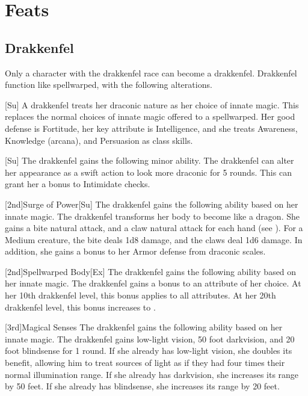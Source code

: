 \section{Feats}

    \subsection{Drakkenfel}

        Only a character with the drakkenfel race can become a drakkenfel. Drakkenfel function like spellwarped, with the following alterations.

        [Su]
        A drakkenfel treats her draconic nature as her choice of innate magic.
        This replaces the normal choices of innate magic offered to a spellwarped.
        Her good defense is Fortitude, her key attribute is Intelligence, and she treats Awareness, Knowledge (arcana), and Persuasion as class skills.

        [Su]
        The drakkenfel gains the following minor ability.
        The drakkenfel can alter her appearance as a swift action to look more draconic for 5 rounds.
        This can grant her a  bonus to Intimidate checks.

        [2nd]{Surge of Power}[Su]
        The drakkenfel gains the following ability based on her innate magic.
        The drakkenfel transforms her body to become like a dragon.
        She gains a bite natural attack, and a claw natural attack for each hand (see ).
        For a Medium creature, the bite deals 1d8 damage, and the claws deal 1d6 damage.
        In addition, she gains a  bonus to her Armor defense from draconic scales.

        [2nd]{Spellwarped Body}[Ex]
        The drakkenfel gains the following ability based on her innate magic.
        The drakkenfel gains a  bonus to an attribute of her choice.
        At her 10th drakkenfel level, this bonus applies to all attributes.
        At her 20th drakkenfel level, this bonus increases to .

        [3rd]{Magical Senses}
        The drakkenfel gains the following ability based on her innate magic.
        The drakkenfel gains low-light vision, 50 foot darkvision, and 20 foot blindsense for 1 round.
        If she already has low-light vision, she doubles its benefit, allowing him to treat sources of light as if they had four times their normal illumination range.
        If she already has darkvision, she increases its range by 50 feet.
        If she already has blindsense, she increases its range by 20 feet.

